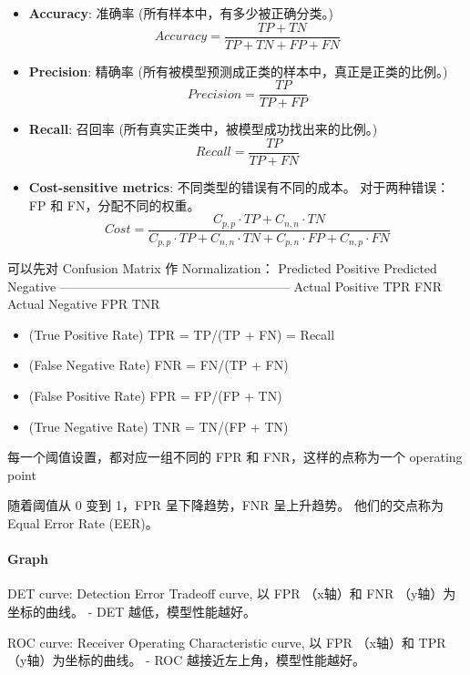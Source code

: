 \documentclass[
]{ctexart}
\providecommand{\tightlist}{%
  \setlength{\itemsep}{0pt}\setlength{\parskip}{0pt}}
\begin{document}
\begin{itemize}
\tightlist
\item
  \textbf{Accuracy}: 准确率 (所有样本中，有多少被正确分类。)
  \[Accuracy = \frac{TP + TN}{TP + TN + FP + FN}\]
\item
  \textbf{Precision}: 精确率
  (所有被模型预测成正类的样本中，真正是正类的比例。)
  \[Precision = \frac{TP}{TP + FP}\]
\item
  \textbf{Recall}: 召回率 (所有真实正类中，被模型成功找出来的比例。)
  \[Recall = \frac{TP}{TP + FN}\]
\item
  \textbf{Cost-sensitive metrics}: 不同类型的错误有不同的成本。
  对于两种错误：FP 和 FN，分配不同的权重。
  \[Cost = \frac{C_{p,p} \cdot TP + C_{n,n} \cdot TN}{C_{p,p} \cdot TP + C_{n,n} \cdot TN + C_{p,n} \cdot FP + C_{n,p} \cdot FN}\]
\end{itemize}

可以先对 Confusion Matrix 作 Normalization： \textbar{} \textbar{}
Predicted Positive \textbar{} Predicted Negative \textbar{}
\textbar---------------\textbar--------------------\textbar--------------------\textbar{}
\textbar{} Actual Positive \textbar{} TPR \textbar{} FNR \textbar{}
\textbar{} Actual Negative \textbar{} FPR \textbar{} TNR \textbar{}

\begin{itemize}
\tightlist
\item
  (True Positive Rate) TPR = TP/(TP + FN) = Recall
\item
  (False Negative Rate) FNR = FN/(TP + FN)
\item
  (False Positive Rate) FPR = FP/(FP + TN)
\item
  (True Negative Rate) TNR = TN/(FP + TN)
\end{itemize}

每一个阈值设置，都对应一组不同的 FPR 和 FNR，这样的点称为一个 operating
point

随着阈值从 0 变到 1，FPR 呈下降趋势，FNR 呈上升趋势。 他们的交点称为
Equal Error Rate (EER)。

\paragraph{Graph}\label{graph}

DET curve: Detection Error Tradeoff curve, 以 FPR （x轴）和 FNR
（y轴）为坐标的曲线。 - DET 越低，模型性能越好。

ROC curve: Receiver Operating Characteristic curve, 以 FPR （x轴）和 TPR
（y轴）为坐标的曲线。 - ROC 越接近左上角，模型性能越好。
\end{document}
